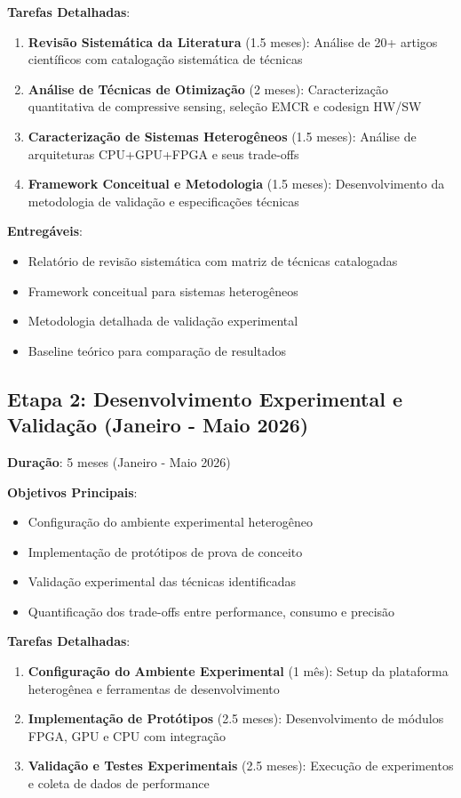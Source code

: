 \textbf{Tarefas Detalhadas}:
\begin{enumerate}
\item \textbf{Revisão Sistemática da Literatura} (1.5 meses): Análise de 20+ artigos científicos com catalogação sistemática de técnicas
\item \textbf{Análise de Técnicas de Otimização} (2 meses): Caracterização quantitativa de compressive sensing, seleção EMCR e codesign HW/SW
\item \textbf{Caracterização de Sistemas Heterogêneos} (1.5 meses): Análise de arquiteturas CPU+GPU+FPGA e seus trade-offs
\item \textbf{Framework Conceitual e Metodologia} (1.5 meses): Desenvolvimento da metodologia de validação e especificações técnicas
\end{enumerate}

\textbf{Entregáveis}:
\begin{itemize}
\item Relatório de revisão sistemática com matriz de técnicas catalogadas
\item Framework conceitual para sistemas heterogêneos
\item Metodologia detalhada de validação experimental
\item Baseline teórico para comparação de resultados
\end{itemize}

\subsection{Etapa 2: Desenvolvimento Experimental e Validação (Janeiro - Maio 2026)}

\textbf{Duração}: 5 meses (Janeiro - Maio 2026)

\textbf{Objetivos Principais}:
\begin{itemize}
\item Configuração do ambiente experimental heterogêneo
\item Implementação de protótipos de prova de conceito
\item Validação experimental das técnicas identificadas
\item Quantificação dos trade-offs entre performance, consumo e precisão
\end{itemize}

\textbf{Tarefas Detalhadas}:
\begin{enumerate}
\item \textbf{Configuração do Ambiente Experimental} (1 mês): Setup da plataforma heterogênea e ferramentas de desenvolvimento
\item \textbf{Implementação de Protótipos} (2.5 meses): Desenvolvimento de módulos FPGA, GPU e CPU com integração
\item \textbf{Validação e Testes Experimentais} (2.5 meses): Execução de experimentos e coleta de dados de performance
\end{enumerate}

